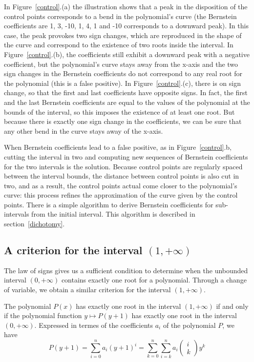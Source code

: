 \documentclass{mscs}
\begin{document}
In Figure~{\ref{control}.(a)} the illustration shows that a peak in
the disposition of the control points corresponds to a bend in the
polynomial's curve (the Bernstein coefficients are 1, 3, -10, 1, 4, 1
and -10 corresponds to a downward peak).  In this case, the peak
provokes two sign changes, which are reproduced in the shape of the
curve and correspond to the existence of two roots inside the
interval.  In Figure~\ref{control}.(b), the coefficients still exhibit
a downward peak with a negative coefficient, but the polynomial's
curve stays away from the x-axis and the two sign changes in the
Bernstein coefficients do not correspond to any real root for the
polynomial (this is a false positive).  In Figure~\ref{control}.(c),
there is on sign change, so that the first and last coefficients have
opposite signs.  In fact, the first and the last Bernstein
coefficients are equal to the values of the polynomial at the bounds
of the interval, so this imposes the existence of at least one root.
But because there is exactly one sign change in the coefficients, we
can be sure that any other bend in the curve stays away of the x-axis.

When Bernstein coefficients lead to a false positive, as in
Figure~{\ref{control}.b}, cutting the interval in two and computing
new sequences of Bernstein coefficients for the two intervals is the
solution.  Because control points are regularly spaced between the
interval bounds, the distance between control points is also cut in
two, and as a result, the control points actual come closer to the polynomial's
curve: this process refines the approximation of the curve given by the
control points.  There is a simple algorithm to derive Bernstein coefficients
for sub-intervals from the initial interval.  This algorithm is described in
section~\ref{dichotomy}.

\subsection{A criterion for the interval \((1,+\infty)\)}
The law of signs gives us a sufficient condition to determine when the
unbounded interval \((0,+\infty)\) contains exactly one root for a
polynomial. Through a change of variable, we obtain a similar
criterion for the interval \((1, +\infty)\).

 The polynomial \(P(x)\)
has exactly one root in the interval \((1,+\infty)\) if and only if
the polynomial function \(y \mapsto P(y+1)\) has exactly one root in
the interval \((0,+\infty)\). Expressed in termes of the
coefficients \(a_i\) of the polynomial
\(P\), we have \[P(y+1)= \sum_{i=0}^{n} a_i (y+1)^i = \sum_{k=0}^{n}
\sum_{i=k}^{n}a_i\left(\begin{array}{c}i\\k\end{array}\right) y^k\]
\end{document}
